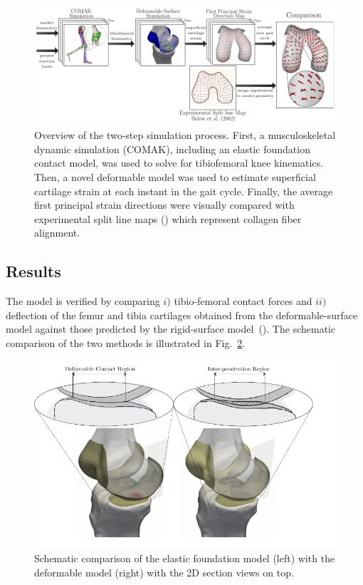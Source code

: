 \begin{figure}[H]
	\begin{center}
		\includegraphics[width=0.98\columnwidth]{images/AC/Overview.pdf}
		\caption{Overview of the two-step simulation process. First, a musculoskeletal dynamic simulation (COMAK), including an elastic foundation contact model, was used to solve for tibiofemoral knee kinematics. Then, a novel deformable model was used to estimate superficial cartilage strain at each instant in the gait cycle. Finally, the average first principal strain directions were visually compared with experimental split line maps (\cite{Below2002}) which represent collagen fiber alignment.}
		\label{fig:overview}
	\end{center}
\end{figure}

\subsection{Results}
\label{sec:Results}
The model is verified by comparing $i)$ tibio-femoral contact forces and $ii)$ deflection of the femur and tibia cartilages obtained from the deformable-surface model against those predicted by the rigid-surface model~(\cite{Smith2016}). The schematic comparison of the two methods is illustrated in Fig.~\ref{fig:comparison}.

\begin{figure}
	\begin{center}
		\includegraphics[width=0.8\columnwidth]{images/AC/Comparison.png}
		\caption{Schematic comparison of the elastic foundation model (left) with the deformable model (right) with the 2D section views on top.}\label{fig:comparison}
	\end{center}
\end{figure}

